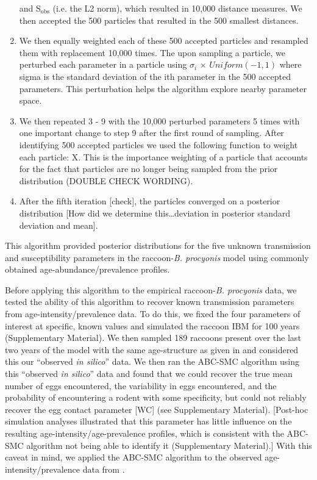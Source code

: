 \documentclass[11pt]{article}
\begin{document}
\begin{enumerate}
  and S$_\text{obs}$ (i.e. the L2 norm), which resulted in 10,000 distance
  measures. We then accepted the 500 particles that resulted in the
  500 smallest distances.
\item
  We then equally weighted each of these 500 accepted particles and
  resampled them with replacement 10,000 times. The upon sampling a
  particle, we perturbed each parameter in a particle using
 $\sigma_i$ $\times$ $Uniform(-1, 1)$ where sigma is the standard
  deviation of the ith parameter in the 500 accepted parameters. This
  perturbation helps the algorithm explore nearby parameter space.
\item
  We then repeated 3 - 9 with the 10,000 perturbed parameters 5
  times with one important change to step 9 after the first round of
  sampling. After identifying 500 accepted particles we used the
  following function to weight each particle: X. This is the
  importance weighting of a particle that accounts for the fact that
  particles are no longer being sampled from the prior distribution \citep{Beaumont2010}
  (DOUBLE CHECK WORDING).
\item
  After the fifth iteration {[}check{]}, the particles converged on a
  posterior distribution {[}How did we determine this\ldots{}deviation
  in posterior standard deviation and mean{]}.
\end{enumerate}

This algorithm provided posterior distributions for the five unknown
transmission and susceptibility parameters in the raccoon-\emph{B.
procyonis} model using commonly obtained age-abundance/prevalence
profiles.  

Before applying this algorithm to the empirical raccoon-\emph{B. procyonis} data, we tested the ability of this algorithm to recover known transmission parameters from age-intensity/prevalence data.  To do this, we fixed the four parameters of interest at specific, known values and simulated the raccoon IBM for 100 years (Supplementary Material).  We then sampled 189 raccoons present over the last two years of the model with the same age-structure as given in \cite{Weinstein2016} and considered this our ``observed \emph{in silico}'' data.  We then ran the ABC-SMC algorithm using this ``observed \emph{in silico}'' data and found that we could recover the true mean number of eggs encountered, the variability in eggs encountered, and the probability of encountering a rodent with some specificity, but could not reliably recover the egg contact parameter [WC] (see Supplementary Material). [Post-hoc simulation analyses illustrated that this parameter has little influence on the resulting age-intensity/age-prevalence profiles, which is consistent with the ABC-SMC algorithm not being able to identify it (Supplementary Material).] With this caveat in mind, we applied the ABC-SMC algorithm to the observed age-intensity/prevalence data from \cite{Weinstein2016}.
\end{document}
